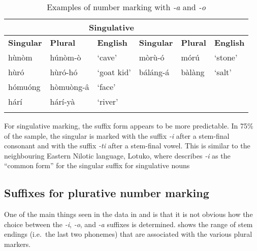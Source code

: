 \documentclass[output=paper]{langsci/langscibook}
\begin{document}
\begin{table}
\begin{tabularx}{\textwidth}{XlXXXX}
\lsptoprule

\multicolumn{3}{c}{ \textbf{Plural}} & \multicolumn{3}{c}{ \textbf{Singulative}}\\ \midrule
 \textbf{Singular} & \textbf{Plural} & \textbf{English} & \textbf{Singular} & \textbf{Plural} & \textbf{English}\\ \midrule
 h\`{u}n\`{o}m &  h\'{u}n\`{o}m-\`{o} & ‘cave’ &  m\`{o}r\`{u}-\'{o} &  m\'{o}r\'{u} & ‘stone’\\
 h\`{u}r\'{o} &  h\`{u}r\'{o}-h\'{o} & ‘goat kid’ &  b\'{a}l\'{a}ng-\'{a} &  b\`{a}l\`{a}ng & ‘salt’\\
 h\'{o}mu\'{o}ng &  h\`{o}mu\`{o}ng-\^{a} & ‘face’ &  &  & \\
 h\'{a}r\'{i} &  h\'{a}r\'{i}-y\`{a} & ‘river’ &  &  & \\
\lspbottomrule
\end{tabularx}
\caption{Examples of number marking with \textit{-a} and \textit{-o}} 
\label{tab:moodie:11}
\end{table}

For singulative marking, the suffix form appears to be more predictable.  In 75\% of the sample, the singular is marked with the suffix \textit{-i} after a stem-final consonant and with the suffix \textit{-ti} after a stem-final vowel. This is similar to the neighbouring Eastern Nilotic language, Lotuko, where \citet[7]{Arber1936} describes \textit{-i} as the “common form” for the singular suffix for singulative nouns 

\subsection{Suffixes for plurative number marking}\label{sec:moodie:4.2} 

One of the main things seen in the data in  and  is that it is not obvious how the choice between the \textit{{}-i}, \textit{-o}, and \textit{{}-a} suffixes is determined.  shows the range of stem endings (i.e.\ the last two phonemes) that are associated with the various plural markers.
\end{document}
